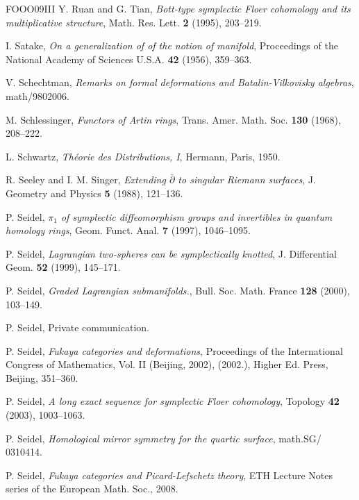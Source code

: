 \begin{thebibliography}{FOOO09III}
 Y. Ruan and G. Tian, \emph{Bott-type symplectic Floer cohomology and its multiplicative structure}, Math. Res. Lett. \textbf{2} (1995), 203–219.

 I. Satake, \emph{On a generalization of of the notion of manifold}, Proceedings of the National Academy of Sciences U.S.A. \textbf{42} (1956), 359–363.

 V. Schechtman, \emph{Remarks on formal deformations and Batalin-Vilkovisky algebras}, math/9802006.

 M. Schlessinger, \emph{Functors of Artin rings}, Trans. Amer. Math. Soc. \textbf{130} (1968), 208–222.

 L. Schwartz, \emph{Théorie des Distributions, I}, Hermann, Paris, 1950.

 R. Seeley and I. M. Singer, \emph{Extending \(\bar\partial\) to singular Riemann surfaces}, J. Geometry and Physics \textbf{5} (1988), 121–136.

 P. Seidel, \emph{\(\pi_1\) of symplectic diffeomorphism groups and invertibles in quantum homology rings}, Geom. Funct. Anal. \textbf{7} (1997), 1046–1095.

 P. Seidel, \emph{Lagrangian two-spheres can be symplectically knotted}, J. Differential Geom. \textbf{52} (1999), 145–171.

 P. Seidel, \emph{Graded Lagrangian submanifolds.}, Bull. Soc. Math. France \textbf{128} (2000), 103–149.

 P. Seidel, Private communication.

 P. Seidel, \emph{Fukaya categories and deformations}, Proceedings of the International Congress of Mathematics, Vol. II (Beijing, 2002), (2002.), Higher Ed. Press, Beijing, 351–360.

 P. Seidel, \emph{A long exact sequence for symplectic Floer cohomology}, Topology \textbf{42} (2003), 1003–1063.

 P. Seidel, \emph{Homological mirror symmetry for the quartic surface}, math.SG/ 0310414.

 P. Seidel, \emph{Fukaya categories and Picard-Lefschetz theory}, ETH Lecture Notes series of the European Math. Soc., 2008.


\end{thebibliography}
